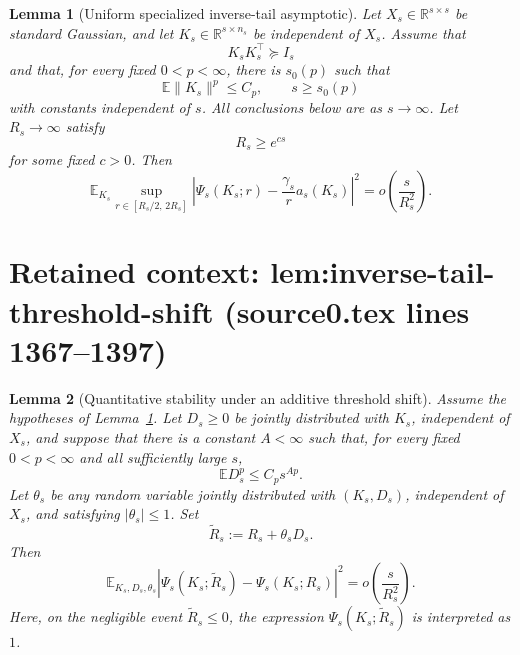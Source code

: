 \documentclass[10pt,a4paper]{amsart}
\newcommand{\Ebb}{\mathbb E}
\newcommand{\R}{\mathbb R}
\theoremstyle{plain}
\newtheorem{lemma}{Lemma}
\begin{document}
\begin{lemma}[Uniform specialized inverse-tail asymptotic]
\label{lem:specialized-inverse-tail}
Let \(X_s\in\R^{s\times s}\) be standard Gaussian, and let
\(K_s\in\R^{s\times n_s}\) be independent of \(X_s\). Assume that
\[
        K_sK_s^\top\succeq I_s
\]
and that, for every fixed \(0<p<\infty\), there is \(s_0(p)\) such that
\begin{equation}
        \Ebb\|K_s\|^p\le C_p,\qquad s\ge s_0(p)
        \label{eq:K-moment-bound}
\end{equation}
with constants independent of \(s\). All conclusions below are as \(s\to\infty\).
Let \(R_s\to\infty\) satisfy
\[
        R_s\ge e^{cs}
\]
for some fixed \(c>0\). Then
\begin{equation}
        \Ebb_{K_s}
        \sup_{r\in[R_s/2,\,2R_s]}
        \left|
        \Psi_s(K_s;r)
        -
        \frac{\gamma_s}{r}a_s(K_s)
        \right|^2
        =
        o\left(\frac{s}{R_s^2}\right).
        \label{eq:uniform-specialized-inverse-tail}
\end{equation}
\end{lemma}


\section*{Retained context: lem:inverse-tail-threshold-shift (source0.tex lines 1367--1397)}

\begin{lemma}[Quantitative stability under an additive threshold shift]
\label{lem:inverse-tail-threshold-shift}
Assume the hypotheses of Lemma~\ref{lem:specialized-inverse-tail}.  Let \(D_s\ge0\) be
jointly distributed with \(K_s\), independent of \(X_s\), and suppose that there is a
constant \(A<\infty\) such that, for every fixed \(0<p<\infty\) and all sufficiently large \(s\),
\begin{equation}
        \Ebb D_s^p\le C_p s^{Ap}.
        \label{eq:threshold-shift-moments}
\end{equation}
Let \(\theta_s\) be any random variable jointly distributed with \((K_s,D_s)\), independent
of \(X_s\), and satisfying \(|\theta_s|\le1\).  Set
\[
        \widetilde R_s
        :=
        R_s+\theta_sD_s.
\]
Then
\begin{equation}
        \Ebb_{K_s,D_s,\theta_s}
        \left|
        \Psi_s(K_s;\widetilde R_s)
        -
        \Psi_s(K_s;R_s)
        \right|^2
        =
        o\left(\frac{s}{R_s^2}\right).
        \label{eq:quantitative-threshold-shift}
\end{equation}
Here, on the negligible event \(\widetilde R_s\le0\), the expression
\(\Psi_s(K_s;\widetilde R_s)\) is interpreted as \(1\).
\end{lemma}
\end{document}
